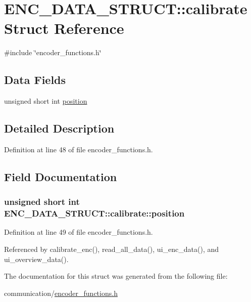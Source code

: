 \hypertarget{structENC__DATA__STRUCT_1_1calibrate}{
\section{ENC\_\-DATA\_\-STRUCT::calibrate Struct Reference}
\label{structENC__DATA__STRUCT_1_1calibrate}
}


{\ttfamily \#include \char`\"{}encoder\_\-functions.h\char`\"{}}

\subsection*{Data Fields}
\begin{DoxyCompactItemize}
\item 
unsigned short int \hyperlink{structENC__DATA__STRUCT_1_1calibrate_aed5100f7dc3d1f358a633c043e13cba2}{position}
\end{DoxyCompactItemize}


\subsection{Detailed Description}


Definition at line 48 of file encoder\_\-functions.h.



\subsection{Field Documentation}
\hypertarget{structENC__DATA__STRUCT_1_1calibrate_aed5100f7dc3d1f358a633c043e13cba2}{
\subsubsection[{position}]{\setlength{\rightskip}{0pt plus 5cm}unsigned short int {\bf ENC\_\-DATA\_\-STRUCT::calibrate::position}}}
\label{structENC__DATA__STRUCT_1_1calibrate_aed5100f7dc3d1f358a633c043e13cba2}


Definition at line 49 of file encoder\_\-functions.h.



Referenced by calibrate\_\-enc(), read\_\-all\_\-data(), ui\_\-enc\_\-data(), and ui\_\-overview\_\-data().



The documentation for this struct was generated from the following file:\begin{DoxyCompactItemize}
\item 
communication/\hyperlink{encoder__functions_8h}{encoder\_\-functions.h}\end{DoxyCompactItemize}
